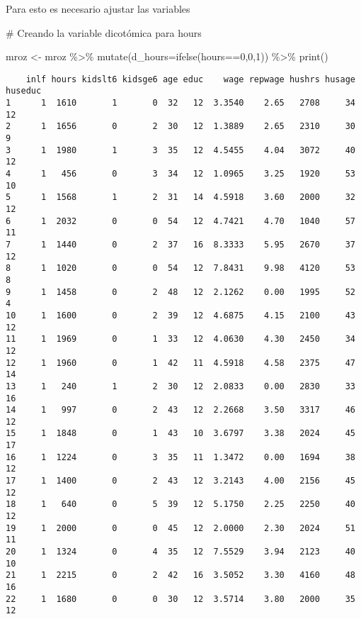 \documentclass[
  letterpaper,
  DIV=11,
  numbers=noendperiod]{scrreprt}
\newenvironment{Shaded}{\begin{snugshade}}{\end{snugshade}}
\newcommand{\AttributeTok}[1]{\textcolor[rgb]{0.40,0.45,0.13}{#1}}
\newcommand{\CommentTok}[1]{\textcolor[rgb]{0.37,0.37,0.37}{#1}}
\newcommand{\DecValTok}[1]{\textcolor[rgb]{0.68,0.00,0.00}{#1}}
\newcommand{\FunctionTok}[1]{\textcolor[rgb]{0.28,0.35,0.67}{#1}}
\newcommand{\NormalTok}[1]{\textcolor[rgb]{0.00,0.23,0.31}{#1}}
\newcommand{\OtherTok}[1]{\textcolor[rgb]{0.00,0.23,0.31}{#1}}
\newcommand{\SpecialCharTok}[1]{\textcolor[rgb]{0.37,0.37,0.37}{#1}}
\begin{document}
Para esto es necesario ajustar las variables

\begin{Shaded}
\begin{Highlighting}[]
\CommentTok{\# Creando la variable dicotómica para hours}

\NormalTok{mroz }\OtherTok{\textless{}{-}}\NormalTok{ mroz }\SpecialCharTok{\%\textgreater{}\%} 
  \FunctionTok{mutate}\NormalTok{(}\AttributeTok{d\_hours=}\FunctionTok{ifelse}\NormalTok{(hours}\SpecialCharTok{==}\DecValTok{0}\NormalTok{,}\DecValTok{0}\NormalTok{,}\DecValTok{1}\NormalTok{)) }\SpecialCharTok{\%\textgreater{}\%} 
  \FunctionTok{print}\NormalTok{()}
\end{Highlighting}
\end{Shaded}

\begin{verbatim}
    inlf hours kidslt6 kidsge6 age educ    wage repwage hushrs husage huseduc
1      1  1610       1       0  32   12  3.3540    2.65   2708     34      12
2      1  1656       0       2  30   12  1.3889    2.65   2310     30       9
3      1  1980       1       3  35   12  4.5455    4.04   3072     40      12
4      1   456       0       3  34   12  1.0965    3.25   1920     53      10
5      1  1568       1       2  31   14  4.5918    3.60   2000     32      12
6      1  2032       0       0  54   12  4.7421    4.70   1040     57      11
7      1  1440       0       2  37   16  8.3333    5.95   2670     37      12
8      1  1020       0       0  54   12  7.8431    9.98   4120     53       8
9      1  1458       0       2  48   12  2.1262    0.00   1995     52       4
10     1  1600       0       2  39   12  4.6875    4.15   2100     43      12
11     1  1969       0       1  33   12  4.0630    4.30   2450     34      12
12     1  1960       0       1  42   11  4.5918    4.58   2375     47      14
13     1   240       1       2  30   12  2.0833    0.00   2830     33      16
14     1   997       0       2  43   12  2.2668    3.50   3317     46      12
15     1  1848       0       1  43   10  3.6797    3.38   2024     45      17
16     1  1224       0       3  35   11  1.3472    0.00   1694     38      12
17     1  1400       0       2  43   12  3.2143    4.00   2156     45      12
18     1   640       0       5  39   12  5.1750    2.25   2250     40      12
19     1  2000       0       0  45   12  2.0000    2.30   2024     51      11
20     1  1324       0       4  35   12  7.5529    3.94   2123     40      10
21     1  2215       0       2  42   16  3.5052    3.30   4160     48      16
22     1  1680       0       0  30   12  3.5714    3.80   2000     35      12

\end{verbatim}
\end{document}
